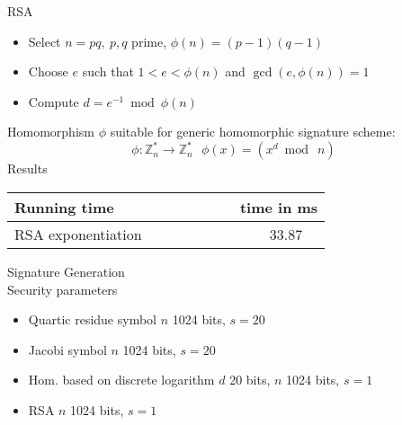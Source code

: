 \documentclass[a4, landscape, slidesonly]{seminar}
\renewcommand{\emph}[1]{{\color{emphcolor} #1}}
\newcommand{\slidetitle}[1]{{\large \color{titlecolor} #1}}
\begin{document}
\begin{slide}
\slidetitle{RSA}
\\[0.2cm]
\begin{itemize}
\item Select $n=pq,~ p,q$ prime, $\phi(n) = (p-1)(q-1)$
\item Choose $e$ such that $1 < e < \phi(n)$ and $ \gcd(e,\phi(n))=1$ 
\item Compute $ d=e^{-1}\bmod \phi(n)$ \\
\end{itemize}

Homomorphism $\phi$ suitable for generic homomorphic signature scheme:
 \begin{displaymath} 
     \phi : \mathbb{Z}^{*}_{n} \to \mathbb{Z}^*_{n} ~~~\phi (x) = (x^d \bmod~ n) 
 \end{displaymath}
\emph{Results}
 \begin{table}[htb] 
 \begin{tabular}{|l c|} 
 \hline 
Running time&  {time in ms}\\ 
 \hline  
 RSA exponentiation ~~~~~~~~~~~& ~~33.87\\
 \hline 
 \end{tabular}
 \end{table}
\end{slide}
\begin{slide}
\slidetitle{Signature Generation}
\\[1.0cm] 
\emph{Security parameters}
\begin{itemize}
\item Quartic residue symbol $n$ 1024 bits, $s = 20$
\item Jacobi symbol $n$ 1024 bits, $s=20$
\item Hom. based on discrete logarithm $d$ 20 bits, $n$ 1024 bits, $s=1$
\item RSA $n$ 1024 bits, $s=1$
\end{itemize}
\end{slide}
\end{document}
